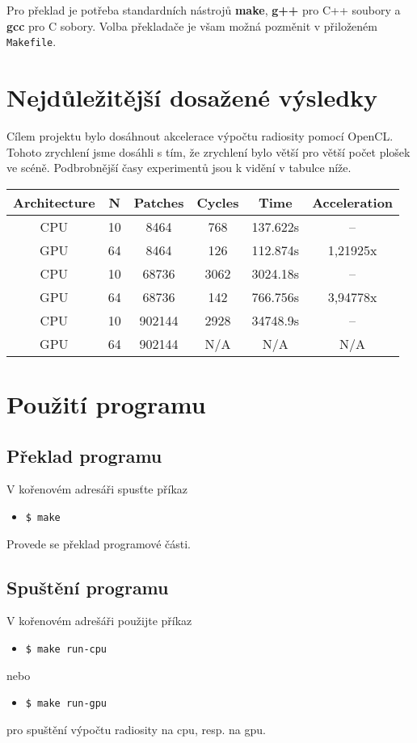 \documentclass[11pt,a4paper]{article}
\begin{document}
Pro překlad je potřeba standardních nástrojů \textbf{make}, \textbf{g++} pro C++ soubory a \textbf{gcc} pro C sobory. Volba překladače je všam možná pozměnit v přiloženém \texttt{Makefile}.


\section{Nejdůležitější dosažené výsledky}
Cílem projektu bylo dosáhnout akcelerace výpočtu radiosity pomocí OpenCL. Tohoto zrychlení jsme dosáhli s tím, že zrychlení bylo větší pro větší počet plošek ve scéně. Podbrobnější časy experimentů jsou k vidění v tabulce níže.

\begin{center}
    \begin{tabular}{| c | c | c | c | c | c |}
      \hline
      Architecture & N & Patches & Cycles & Time & Acceleration \\
      \hline
      CPU & 10 & 8464 & 768 & 137.622s & -- \\
      GPU & 64 & 8464 & 126 & 112.874s & 1,21925x \\
      \hline
      CPU & 10 & 68736 & 3062 & 3024.18s & -- \\
      GPU & 64 & 68736 & 142 & 766.756s & 3,94778x \\
      \hline
      CPU & 10 & 902144 & 2928 & 34748.9s & -- \\
      GPU & 64 & 902144 & N/A & N/A & N/A \\
      \hline
    \end{tabular}
\end{center}

\section{Použití programu}

\subsection{Překlad programu}
V kořenovém adresáři spusťte příkaz
\begin{itemize}
  \item[] \texttt{\$ make}
\end{itemize}
Provede se překlad programové části.


\subsection{Spuštění programu}
V kořenovém adrešáři použijte příkaz
\begin{itemize}
  \item[] \texttt{\$ make run-cpu}
\end{itemize}
nebo
\begin{itemize}
  \item[] \texttt{\$ make run-gpu}
\end{itemize}
pro spuštění výpočtu radiosity na cpu, resp. na gpu.
\end{document}
